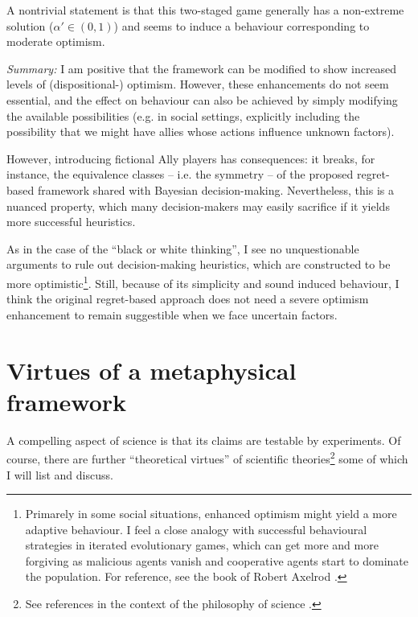 \documentclass{article}
\begin{document}
A nontrivial statement is that this two-staged game generally has a non-extreme solution ($\alpha' \in (0,1)$) and seems to induce a behaviour corresponding to moderate optimism.

{\it Summary:}
I am positive that the framework can be modified to show increased levels of (dispositional-) optimism. 
However, these enhancements do not seem essential, and the effect on behaviour can also be achieved by simply modifying the available possibilities (e.g. in social settings, explicitly including the possibility that we might have allies whose actions influence unknown factors).

However, introducing fictional Ally players has consequences: it breaks, for instance, the equivalence classes -- i.e. the symmetry -- of the proposed regret-based framework shared with Bayesian decision-making.
Nevertheless, this is a nuanced property, which many decision-makers may easily sacrifice if it yields more successful heuristics.

As in the case of the ``black or white thinking'', I see no unquestionable arguments to rule out decision-making heuristics, which are constructed to be more optimistic\footnote{Primarely in some social situations, enhanced optimism might yield a more adaptive behaviour. I feel a close analogy with successful behavioural strategies in iterated evolutionary games, which can get more and more forgiving as malicious agents vanish and cooperative agents start to dominate the population. For reference, see the book of Robert Axelrod \cite{book:Axelrod}.}. Still, because of its simplicity and sound induced behaviour, I think the original regret-based approach does not need a severe optimism enhancement to remain suggestible when we face uncertain factors.


\section*{Virtues of a metaphysical framework}

A compelling aspect of science is that its claims are testable by experiments. Of course, there are further ``theoretical virtues'' of scientific theories\footnote{See references in the context of the philosophy of science \cite{paper:TheoreticalVirtues,book:TheoreticalVirtues}.} some of which I will list and discuss.
\end{document}
